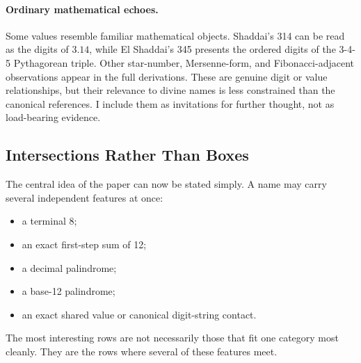 \paragraph{Ordinary mathematical echoes.}
Some values resemble familiar mathematical objects. Shaddai's 314 can be read as the digits of $3.14$, while El Shaddai's 345 presents the ordered digits of the 3-4-5 Pythagorean triple. Other star-number, Mersenne-form, and Fibonacci-adjacent observations appear in the full derivations. These are genuine digit or value relationships, but their relevance to divine names is less constrained than the canonical references. I include them as invitations for further thought, not as load-bearing evidence.

\subsection{Intersections Rather Than Boxes}

The central idea of the paper can now be stated simply. A name may carry several independent features at once:

\begin{itemize}
\item a terminal 8;
\item an exact first-step sum of 12;
\item a decimal palindrome;
\item a base-12 palindrome;
\item an exact shared value or canonical digit-string contact.
\end{itemize}

The most interesting rows are not necessarily those that fit one category most cleanly. They are the rows where several of these features meet.
